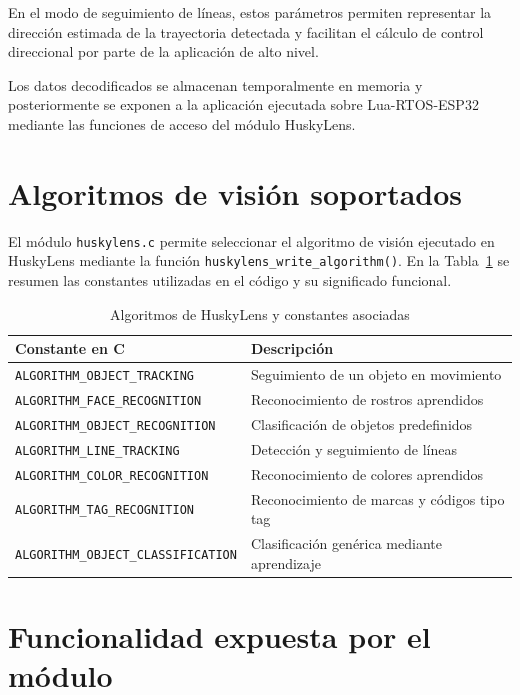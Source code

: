 \documentclass{prgrado}
\begin{document}
En el modo de seguimiento de líneas, estos parámetros permiten representar la
dirección estimada de la trayectoria detectada y facilitan el cálculo de control
direccional por parte de la aplicación de alto nivel.

Los datos decodificados se almacenan temporalmente en memoria y posteriormente
se exponen a la aplicación ejecutada sobre Lua-RTOS-ESP32 mediante las funciones
de acceso del módulo HuskyLens.

\section{Algoritmos de visión soportados}

El módulo \texttt{huskylens.c} permite seleccionar el algoritmo de visión ejecutado en HuskyLens mediante la función \texttt{huskylens\_write\_algorithm()}. En la Tabla~\ref{tab:algoritmos_huskylens} se resumen las constantes utilizadas en el código y su significado funcional.

\begin{table}[htbp]
\centering
\caption{Algoritmos de HuskyLens y constantes asociadas}
\label{tab:algoritmos_huskylens}
\begin{tabular}{|l|l|}
\hline
\textbf{Constante en C} & \textbf{Descripción} \\ \hline
\texttt{ALGORITHM\_OBJECT\_TRACKING}       & Seguimiento de un objeto en movimiento \\ \hline
\texttt{ALGORITHM\_FACE\_RECOGNITION}      & Reconocimiento de rostros aprendidos \\ \hline
\texttt{ALGORITHM\_OBJECT\_RECOGNITION}    & Clasificación de objetos predefinidos \\ \hline
\texttt{ALGORITHM\_LINE\_TRACKING}         & Detección y seguimiento de líneas \\ \hline
\texttt{ALGORITHM\_COLOR\_RECOGNITION}     & Reconocimiento de colores aprendidos \\ \hline
\texttt{ALGORITHM\_TAG\_RECOGNITION}       & Reconocimiento de marcas y códigos tipo tag \\ \hline
\texttt{ALGORITHM\_OBJECT\_CLASSIFICATION} & Clasificación genérica mediante aprendizaje \\ \hline
\end{tabular}
\end{table}

\section{Funcionalidad expuesta por el módulo}
\end{document}
